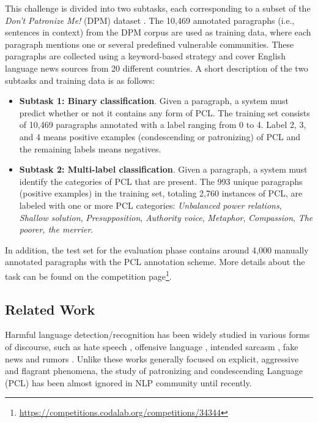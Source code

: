 \documentclass[11pt]{article}
\begin{document}
This challenge is divided into two subtasks, each corresponding to a subset of the \textit{Don't Patronize Me!} (DPM) dataset \citep{perez2020don}.
The 10,469 annotated paragraphs (i.e., sentences in context) from the DPM corpus are used as training data, where each paragraph mentions one or several predefined vulnerable communities.
These paragraphs are collected using a keyword-based strategy and cover English language news sources from 20 different countries. A short description of the two subtasks and training data is as follows:
\begin{itemize}
    \item \textbf{Subtask 1: Binary classification}. Given a paragraph, a system must predict whether or not it contains any form of PCL. The training set consists of 10,469 paragraphs annotated with a label ranging from 0 to 4. Label 2, 3, and 4 means positive examples (condescending or patronizing) of PCL and the remaining labels means negatives. \item \textbf{Subtask 2: Multi-label classification}. Given a paragraph, a system must identify the categories of PCL that are present.
The 993 unique paragraphs (positive examples) in the training set, totaling 2,760 instances of PCL, are labeled with one or more PCL categories: 
    \textit{Unbalanced power relations}, \textit{Shallow solution}, \textit{Presupposition}, \textit{Authority voice}, \textit{Metaphor}, \textit{Compassion}, \textit{The poorer, the merrier}.
\end{itemize}
In addition, the test set for the evaluation phase contains around 4,000 manually annotated paragraphs with the PCL annotation scheme.
More details about the task can be found on the competition page\footnote{\url{https://competitions.codalab.org/competitions/34344}}. 



\subsection{Related Work}
Harmful language detection/recognition has been widely studied in various forms of discourse, such as hate speech \citep{DBLP:conf/semeval/BasileBFNPPRS19}, offensive language \citep{DBLP:conf/semeval/ZampieriMNRFK19}, intended sarcasm \citep{duhjjms2022semeval}, fake news \citep{DBLP:conf/www/ZhangCLSZS21} and rumors \citep{DBLP:conf/acl/WeiHZYH20,dou2021rumor}.  Unlike these works generally focused on explicit, aggressive and flagrant phenomena, the study of patronizing and condescending Language (PCL) \citep{giles1993patronizing,huckin2002critical,chouliaraki2006spectatorship,margic2017communication} has been almost ignored in NLP community until recently.
\end{document}
